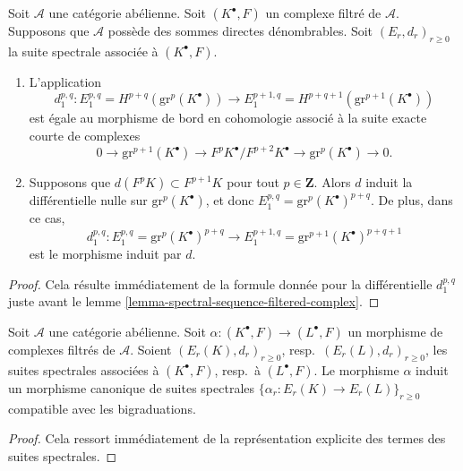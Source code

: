 \begin{lemma}
\label{lemma-spectral-sequence-filtered-complex-d1}
Soit $\mathcal{A}$ une catégorie abélienne.
Soit $(K^\bullet, F)$ un complexe filtré de $\mathcal{A}$.
Supposons que $\mathcal{A}$ possède des sommes directes dénombrables.
Soit $(E_r, d_r)_{r \geq 0}$ la suite spectrale
associée à $(K^\bullet, F)$.
\begin{enumerate}
\item L'application
$$
d_1^{p, q} :
E_1^{p, q} = H^{p + q}(\text{gr}^p(K^\bullet))
\longrightarrow
E_1^{p + 1, q} = H^{p + q + 1}(\text{gr}^{p + 1}(K^\bullet))
$$
est égale au morphisme de bord en cohomologie associé à la suite
exacte courte de complexes
$$
0 \to \text{gr}^{p + 1}(K^\bullet) \to
F^pK^\bullet/F^{p + 2}K^\bullet \to \text{gr}^p(K^\bullet) \to 0.
$$
\item Supposons que $d(F^pK) \subset F^{p + 1}K$ pour tout $p \in \mathbf{Z}$.
Alors $d$ induit la différentielle nulle sur $\text{gr}^p(K^\bullet)$,
et donc
$E_1^{p, q} = \text{gr}^p(K^\bullet)^{p + q}$.
De plus, dans ce cas,
$$
d_1^{p, q} :
E_1^{p, q} = \text{gr}^p(K^\bullet)^{p + q}
\longrightarrow
E_1^{p + 1, q} = \text{gr}^{p + 1}(K^\bullet)^{p + q + 1}
$$
est le morphisme induit par $d$.
\end{enumerate}
\end{lemma}

\begin{proof}
Cela résulte immédiatement de la formule donnée pour la différentielle
$d_1^{p, q}$ juste avant le lemme \ref{lemma-spectral-sequence-filtered-complex}.
\end{proof}

\begin{lemma}
\label{lemma-spectral-sequence-filtered-complex-functorial}
Soit $\mathcal{A}$ une catégorie abélienne.
Soit $\alpha : (K^\bullet, F) \to (L^\bullet, F)$ un morphisme de
complexes filtrés de $\mathcal{A}$. Soient $(E_r(K), d_r)_{r \geq 0}$,
resp.\ $(E_r(L), d_r)_{r \geq 0}$, les suites spectrales associées
à $(K^\bullet, F)$, resp.\ à $(L^\bullet, F)$.
Le morphisme $\alpha$ induit un morphisme canonique de suites
spectrales $\{\alpha_r : E_r(K) \to E_r(L)\}_{r \geq 0}$ compatible
avec les bigraduations.
\end{lemma}

\begin{proof}
Cela ressort immédiatement de la représentation explicite des termes des
suites spectrales.
\end{proof}

